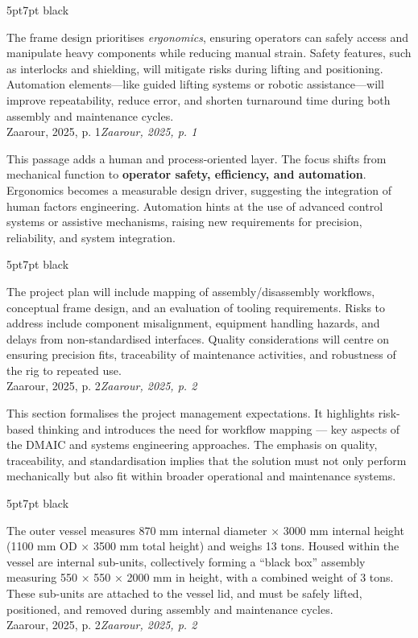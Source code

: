 \documentclass{report}
\newcommand{\formalsource}{}
\newenvironment{formal}[3][]{	\renewcommand{\formalsource}{#1}
	\def\lefty{\color{#2}\textquotedblleft}
	\def\righty{\color{#2}\textquotedblright}
	\def\FrameCommand{%
		\hspace{1pt}%
		{\color{#2}\vrule width 2pt}%
		{\color{#3}\vrule width 4pt}%
		\colorbox{#3}%
	}%
	\MakeFramed{\advance\hsize-\width\FrameRestore}%
	\begin{adjustwidth}{5pt}{7pt}%
		\vspace{4pt}%
		\ifx#2\empty\else\smash{\raisebox{-0.5em}{\huge\lefty}}\hspace{0em}\fi%
	}{%
		\hspace{0em}\smash{\raisebox{-0.5em}{\huge\righty}}\\%
		\vspace{0pt}%
		\ifx\formalsource\empty\else\hfill{\footnotesize\textit{\formalsource}}\fi%
	\end{adjustwidth}%
	\endMakeFramed%
	\noindent%
}
\begin{document}
\begin{formal}[Zaarour, 2025, p. 1]{black}{white}
	The frame design prioritises \textit{ergonomics}, ensuring operators can safely access and manipulate heavy components while reducing manual strain. Safety features, such as interlocks and shielding, will mitigate risks during lifting and positioning. Automation elements—like guided lifting systems or robotic assistance—will improve repeatability, reduce error, and shorten turnaround time during both assembly and maintenance cycles.
\end{formal}
This passage adds a human and process-oriented layer. The focus shifts from mechanical function to \textbf{operator safety, efficiency, and automation}. Ergonomics becomes a measurable design driver, suggesting the integration of human factors engineering. Automation hints at the use of advanced control systems or assistive mechanisms, raising new requirements for precision, reliability, and system integration.
\begin{formal}[Zaarour, 2025, p. 2]{black}{white}
	The project plan will include mapping of assembly/disassembly workflows, conceptual frame design, and an evaluation of tooling requirements. Risks to address include component misalignment, equipment handling hazards, and delays from non-standardised interfaces. Quality considerations will centre on ensuring precision fits, traceability of maintenance activities, and robustness of the rig to repeated use.
\end{formal}
This section formalises the project management expectations. It highlights risk-based thinking and introduces the need for workflow mapping — key aspects of the DMAIC and systems engineering approaches. The emphasis on quality, traceability, and standardisation implies that the solution must not only perform mechanically but also fit within broader operational and maintenance systems.

\begin{formal}[Zaarour, 2025, p. 2]{black}{white}
	The outer vessel measures 870 mm internal diameter × 3000 mm internal height (1100 mm OD × 3500 mm total height) and weighs 13 tons. Housed within the vessel are internal sub-units, collectively forming a “black box” assembly measuring 550 × 550 × 2000 mm in height, with a combined weight of 3 tons. These sub-units are attached to the vessel lid, and must be safely lifted, positioned, and removed during assembly and maintenance cycles.
\end{formal}
\end{document}
